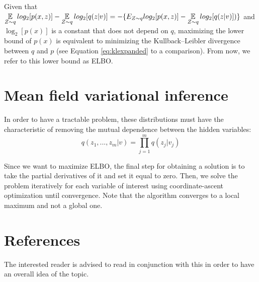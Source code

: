 Given that $ \displaystyle \operatorname*{\mathbb{E}}_{Z \sim q} log_2[p(x,z)] - \operatorname*{\mathbb{E}}_{Z \sim q} log_2[q(z | v)] = -\{E_{Z \sim q} log_2[p(x,z)] - \operatorname*{\mathbb{E}}_{Z \sim q} log_2[q(z | v)])\}$
and $\log_2[p(x)]$ is a constant that does not depend on $q$,
maximizing the lower bound of $p(x)$ is equivalent to minimizing the Kullback–Leibler divergence between $q$ and $p$ (see Equation \ref{eq:klexpanded} to a comparison).
From now, we refer to this lower bound as ELBO.

\section{Mean field variational inference}
In order to have a tractable problem, these distributions must have the characteristic
of removing the mutual dependence between the hidden variables:
$$ q(z_1, ..., z_m| v) = \prod_{j=1}^m q(z_j | v_j) $$

Since we want to maximize ELBO,
the final step for obtaining a solution is to take the partial derivatives of it and set it equal to zero.
Then, we solve the problem iteratively for each variable of interest using coordinate-ascent optimization until convergence.
Note that the algorithm converges to a local maximum and not a global one.

\section{References}
The interested reader is advised to read \cite{Blei_2017} in conjunction with this in order to have an overall idea of the topic.